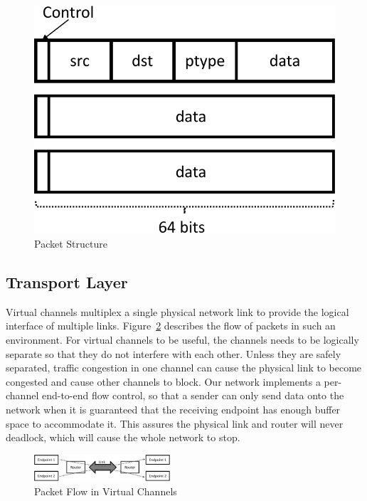 \begin{figure}[h]
	\begin{center}
	\includegraphics[scale=0.45]{resources/packet-crop.pdf}
	\caption{Packet Structure}
	\label{fig:packet}
	\end{center}
\end{figure}







\subsection{Transport Layer}
\label{sec:transportlayer}

Virtual channels multiplex a single physical network link to provide the logical
interface of multiple links. Figure~\ref{fig:virtual} describes the flow of
packets in such an environment. For virtual channels to be useful, the channels
needs to be logically separate so that they do not interfere with each other. 
Unless they are safely separated, traffic congestion in one channel can cause
the physical link to become congested and cause other channels to block. 
Our network implements a per-channel end-to-end flow control, so that a sender
can only send data onto the network when it is guaranteed that the receiving
endpoint has enough buffer space to accommodate it. This assures the physical
link and router will never deadlock, which will cause the whole network to stop.

\begin{figure}[h]
	\begin{center}
	\includegraphics[width=0.45\textwidth]{resources/virtual-crop.pdf}
	\caption{Packet Flow in Virtual Channels}
	\label{fig:virtual}
	\end{center}
\end{figure}


